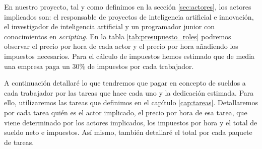 En nuestro proyecto, tal y como definimos en la sección \ref{sec:actores}, los actores implicados
son: el responsable de proyectos de inteligencia artificial e innovación, el investigador de
inteligencia artificial y un programador junior con conocimientos en \textit{scripting}. En la tabla
\ref{tab:presupuesto_roles} podremos observar el precio por hora de cada actor y el precio por hora
añadiendo los impuestos necesarios. Para el cálculo de impuestos hemos estimado que de media una
empresa paga un 30\% de impuestos por cada trabajador.

\begin{table}[H]
    \centering
    \caption[Salarios netos medios por hora para cada rol]{Salarios netos medios por hora para cada rol (\cite{Glassdoor})}
    \label{tab:presupuesto_roles}
\end{table}

A continuación detallaré lo que tendremos que pagar en concepto de sueldos a cada trabajador
por las tareas que hace cada uno y la dedicación estimada. Para ello, utilizaremos 
las tareas que definimos en el capítulo \ref{cap:tareas}. Detallaremos por cada tarea
quién es el actor implicado, el precio por hora de esa tarea, que viene determinado
por los actores implicados, los impuestos por hora y el total de sueldo neto e impuestos.
Así mismo, también detallaré el total por cada paquete de tareas.

